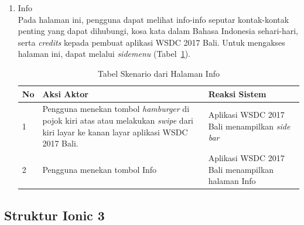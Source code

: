 \begin{enumerate}
	\item Info \\
	Pada halaman ini, pengguna dapat melihat info-info seputar kontak-kontak penting yang dapat dihubungi, kosa kata dalam Bahasa Indonesia sehari-hari, serta {\it credits} kepada pembuat aplikasi WSDC 2017 Bali. Untuk mengakses halaman ini, dapat melalui \textit{sidemenu} (Tabel~\ref{table:skenarioHalamanInfo}).
		\begin{table}[H]
			\centering
			\begin{tabular}{|p{0.5cm}|p{7cm}|p{7cm}|}
				\hline
				No & Aksi Aktor                               & Reaksi Sistem                                          \\ \hline
				1  & Pengguna menekan tombol {\it hamburger} di pojok kiri atas atau melakukan \textit{swipe} dari kiri layar ke kanan layar aplikasi WSDC 2017 Bali. & Aplikasi WSDC 2017 Bali menampilkan {\it side bar} \\ \hline
				2  & Pengguna menekan tombol Info & Aplikasi WSDC 2017 Bali menampilkan halaman Info \\ \hline
			\end{tabular}
			\caption{Tabel Skenario dari Halaman Info}
			\label{table:skenarioHalamanInfo}
		\end{table}
\end{enumerate}

\subsection{Struktur Ionic 3}
\label{sec:StrukturIonic3SistemKini}

